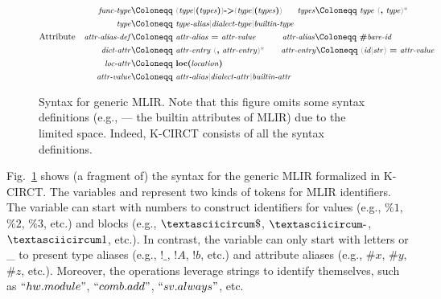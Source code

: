 \begin{figure}
\[\begin{aligned}
\\
& & \syn{func-type} \Coloneqq  &\ \scmd{(} \syn{type} \scmd{$\mid$} \tok{(} \syn{types} \tok{)} \scmd{)} \tok{->} \scmd{(} \syn{type} \scmd{$\mid$} \tok{(} \syn{types} \tok{)} \scmd{)} \hspace{17pt} \syn{types} \Coloneqq \ \syn{type}\ \scmd{(} \tok{,}\ \syn{type} \scmd{)*}
\\
& &
\syn{type} \Coloneqq &\ \syn{type-alias} \scmd{$\mid$} \syn{dialect-type} \scmd{$\mid$} \syn{builtin-type}
\\
&\text{Attribute}&
\syn{attr-alias-def} \Coloneqq &\ \syn{attr-alias}\ \tok{=}\ \syn{attr-value} \hspace{30pt} \syn{attr-alias} \Coloneqq \ \tok{\#}\syn{bare-id}
\\
& &
\syn{dict-attr} \Coloneqq &\ \syn{attr-entry} \ \scmd{(} \tok{,}\ \syn{attr-entry} \scmd{)*} \hspace{19pt} \syn{attr-entry} \Coloneqq \ \scmd{(} \syn{id} \scmd{$\mid$} \syn{str}  \scmd{)} \ \tok{=} \ \syn{attr-value} 
\\
& & \syn{loc-attr} \Coloneqq &\ \tok{loc} \tok{(} \syn{location} \tok{)}
\\
& &
\syn{attr-value} \Coloneqq &\ \syn{attr-alias} \scmd{$\mid$} \syn{dialect-attr} \scmd{$\mid$} \syn{builtin-attr} \hspace{7.5em} 
\\
\end{aligned}\]
\caption{Syntax for generic MLIR. Note that this figure omits some syntax definitions (e.g.,  --- the builtin attributes of MLIR) due to the limited space. Indeed, K-CIRCT consists of all the syntax definitions.}
\label{fig:mlir-syntax}
\end{figure}

Fig.~\ref{fig:mlir-syntax} shows (a fragment of) the syntax for the generic MLIR formalized in K-CIRCT. The variables  and  represent two kinds of tokens for MLIR identifiers. The variable  can start with numbers to construct identifiers for values (e.g., $\%1$, $\%2$, $\%3$, etc.) and blocks (e.g., $\textasciicircum\$$, $\textasciicircum\text{-}$, $\textasciicircum1$, etc.). In contrast, the variable  can only start with letters or \_ to present type aliases (e.g., $!\_$, $!A$, $!b$, etc.) and attribute aliases (e.g., $\#x$, $\#y$, $\#z$, etc.). Moreover, the operations leverage strings  to identify themselves, such as $``hw.module"$, $``comb.add"$, $``sv.always"$, etc.


